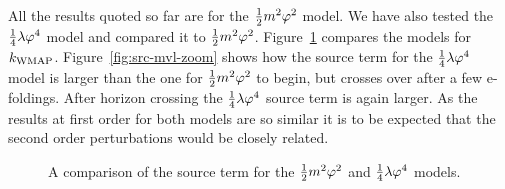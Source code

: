 All the results quoted so far are for
the $\frac{1}{2} m^2 \varphi^2$ model. We have also tested the $\frac{1}{4}\lambda\varphi^4$ model and compared it to
$\frac{1}{2} m^2 \varphi^2$. Figure~\ref{fig:src-mvl-main} compares the models for $k_\mathrm{WMAP}$.
Figure~\ref{fig:src-mvl-zoom} shows how the source term for the $\frac{1}{4}\lambda\varphi^4$ model is larger
than the one for $\frac{1}{2} m^2 \varphi^2$ to begin, but crosses over after a few e-foldings. After horizon
crossing the $\frac{1}{4}\lambda\varphi^4$ source term is again larger. As the results at first order for both
models are so similar it is to be expected that the second order perturbations would be closely
related. 
% 
\begin{figure}
% 
\caption{A comparison of the source term for the $\frac{1}{2} m^2 \varphi^2$ and
$\frac{1}{4}\lambda\varphi^4$ models.}
\label{fig:src-mvl-main}
\end{figure}
% 


